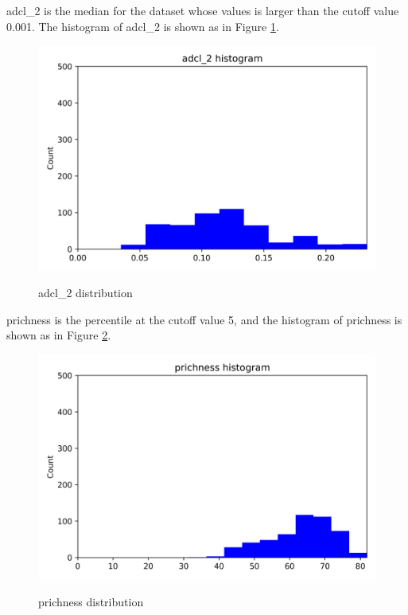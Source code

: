 \documentclass{article}
\begin{document}
adcl_2 is the median for the dataset whose values is larger than the cutoff value 0.001. The histogram of adcl_2 is shown as in Figure \ref{adcl_2-communitylevel}. \par
\begin{figure}[H]
	\centering
	\includegraphics[width=\textwidth, keepaspectratio]{adcl_2-communitylevel.png}\\
	\caption{adcl_2 distribution}
	\label{adcl_2-communitylevel}
\end{figure}
prichness is the percentile at the cutoff value 5, and the histogram of prichness is shown as in Figure \ref{prichness-communitylevel}. \par
\begin{figure}[H]
	\centering
	\includegraphics[width=\textwidth, keepaspectratio]{prichness-communitylevel.png}\\
	\caption{prichness distribution}
	\label{prichness-communitylevel}
\end{figure}
\end{document}
